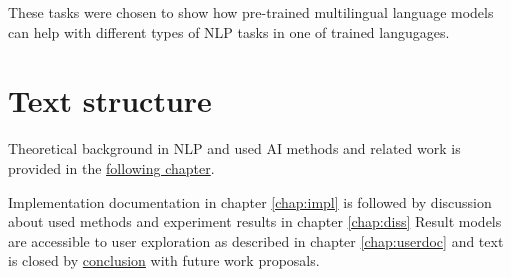 These tasks were chosen to show how pre-trained multilingual language models can help with different types of NLP tasks in one of trained langugages. 

\section*{Text structure}
Theoretical background in NLP and used AI methods and related work is provided in the \hyperref[chap:theandme]{following chapter}.

Implementation documentation in chapter \ref{chap:impl} is followed by discussion about used methods and experiment results in chapter \ref{chap:diss} Result models are accessible to user exploration as described in chapter \ref{chap:userdoc} and text is closed by \hyperref[chap:concl]{conclusion} with future work proposals.


